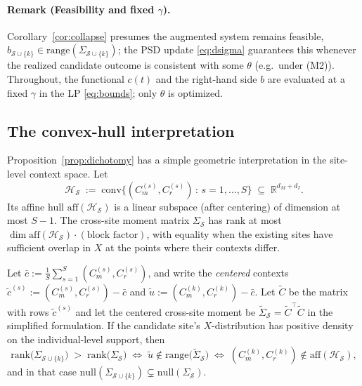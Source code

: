 \paragraph{Remark (Feasibility and fixed $\gamma$).}
Corollary~\ref{cor:collapse} presumes the augmented system remains feasible,
$b_{\mathcal{S}\cup\{k\}}\in\mathrm{range}(\Sigma_{\mathcal{S}\cup\{k\}})$; the
PSD update \eqref{eq:dsigma} guarantees this whenever the realized candidate
outcome is consistent with some $\theta$ (e.g.\ under (M2)). Throughout, the
functional $c(t)$ and the right-hand side $b$ are evaluated at a fixed $\gamma$
in the LP \eqref{eq:bounds}; only $\theta$ is optimized.

\subsection{The convex-hull interpretation}
\label{sec:hull-interp}

Proposition~\ref{prop:dichotomy} has a simple geometric interpretation in the
site-level context space. Let
\[
\mathcal{H}_\mathcal{S} \;:=\; \mathrm{conv}\!\bigl\{(C_m^{(s)}, C_r^{(s)})\,:\,
 s = 1, \ldots, S\bigr\} \;\subseteq\; \mathbb{R}^{d_M+d_I}.
\]
Its affine hull $\mathrm{aff}(\mathcal{H}_\mathcal{S})$ is a linear
subspace (after centering) of dimension at most $S-1$. The cross-site moment
matrix $\Sigma_\mathcal{S}$ has rank at most $\dim\mathrm{aff}(\mathcal{H}_\mathcal{S})
 \cdot (\text{block factor})$, with equality when the existing sites have
sufficient overlap in $X$ at the points where their contexts differ.

\begin{proposition}
\label{prop:hull}
Let $\bar c := \tfrac1S\sum_{s=1}^S (C_m^{(s)},C_r^{(s)})$, and write the
\emph{centered} contexts $\tilde c^{(s)} := (C_m^{(s)},C_r^{(s)})-\bar c$ and
$\tilde u := (C_m^{(k)},C_r^{(k)})-\bar c$. Let $\tilde C$ be the matrix with
rows $\tilde c^{(s)}$ and let the centered cross-site moment be
$\tilde\Sigma_\mathcal{S}=\tilde C^\top\tilde C$ in the simplified formulation.
If the candidate site's $X$-distribution has
positive density on the individual-level support, then
\[
\mathrm{rank}\bigl(\Sigma_{\mathcal{S}\cup\{k\}}\bigr)
 \;>\; \mathrm{rank}\bigl(\Sigma_\mathcal{S}\bigr)
\;\Longleftrightarrow\;
 \tilde u\notin\mathrm{range}\bigl(\tilde\Sigma_\mathcal{S}\bigr)
\;\Longleftrightarrow\;
 (C_m^{(k)},C_r^{(k)})\notin\mathrm{aff}(\mathcal{H}_\mathcal{S}),
\]
and in that case
$\mathrm{null}(\Sigma_{\mathcal{S}\cup\{k\}})\subsetneq\mathrm{null}(\Sigma_\mathcal{S})$.
\end{proposition}

